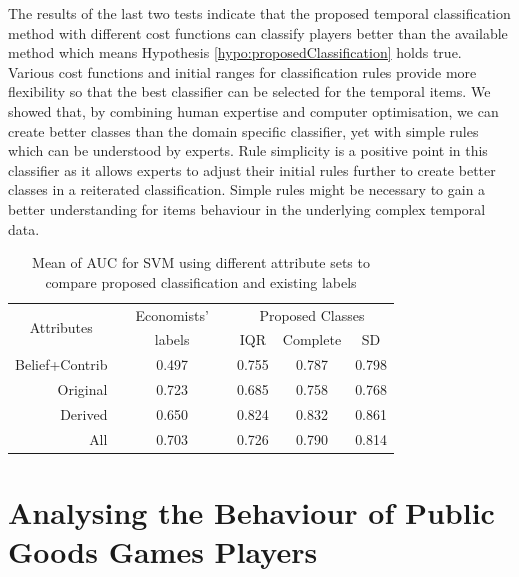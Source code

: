 The results of the last two tests indicate that the proposed temporal classification method with different cost functions can classify players better than the available method which means Hypothesis \ref{hypo:proposedClassification} holds true. Various cost functions and initial ranges for classification rules provide more flexibility so that the best classifier can be selected for the temporal items. We showed that, by combining human expertise and computer optimisation, we can create better classes than the domain specific classifier, yet with simple rules which can be understood by experts. Rule simplicity is a positive point in this classifier as it allows experts to adjust their initial rules further to create better classes in a reiterated classification. Simple rules might be necessary to gain a better understanding for items behaviour in the underlying complex temporal data.


\begin{table}[!h]
    \small
    \centering
    \caption{Mean of AUC for SVM using different attribute sets to compare proposed classification and existing labels}
    \label{teb:AUCofSVMTest}
    \begin{tabular}{rcccccc}
        \toprule
        \multicolumn{1}{c}{\multirow{2}{*}{Attributes}} & \phantom{a} & Economists' & \phantom{a} & \multicolumn{3}{c}{Proposed Classes} \\
        \cmidrule{5-7}
        \multicolumn{1}{c}{}  & \phantom{a} & labels   & \phantom{a}     & IQR       & Complete     & SD        \\
        \midrule
        Belief+Contrib    & \phantom{a}  & 0.497     & \phantom{a}    & 0.755     & 0.787        & 0.798     \\
        Original  & \phantom{a} & 0.723  & \phantom{a}       & 0.685     & 0.758        & 0.768     \\
        Derived    & \phantom{a} & 0.650  & \phantom{a}       & 0.824     & 0.832        & 0.861     \\
        All  & \phantom{a} & 0.703  & \phantom{a}       & 0.726     & 0.790        & 0.814    \\
        \bottomrule
    \end{tabular}
\end{table}


\section{Analysing the Behaviour of Public Goods Games Players}



